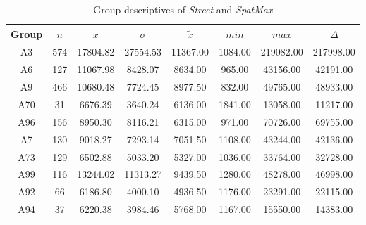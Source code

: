 \begin{table}[ht]
	\tiny
	\centering
	\begin{tabular}{c|c|c|c|c|c|c|c}
		\toprule
		Group & $n$ & $\bar{x}$ & $\sigma$ & $\tilde{x}$ & $min$ & $max$ & $\Delta$ \\  
		\midrule
		A3 & 574 & 17804.82 & 27554.53 & 11367.00 & 1084.00 & 219082.00 & 217998.00 \\ 
		A6 & 127 & 11067.98 & 8428.07 & 8634.00  & 965.00 & 43156.00 & 42191.00 \\ 
		A9 & 466 & 10680.48 & 7724.45 & 8977.50 & 832.00 & 49765.00 & 48933.00 \\ 
		A70 & 31 & 6676.39 & 3640.24 & 6136.00 & 1841.00 & 13058.00 & 11217.00 \\ 
		A96 & 156 & 8950.30 & 8116.21 & 6315.00 & 971.00 & 70726.00 & 69755.00 \\ 
		A7 & 130 & 9018.27 & 7293.14 & 7051.50 & 1108.00 & 43244.00 & 42136.00 \\ 
		A73 & 129 & 6502.88 & 5033.20 & 5327.00 & 1036.00 & 33764.00 & 32728.00 \\ 
		A99 & 116 & 13244.02 & 11313.27 & 9439.50 & 1280.00 & 48278.00 & 46998.00 \\ 
		A92 & 66 & 6186.80 & 4000.10 & 4936.50 & 1176.00 & 23291.00 & 22115.00 \\ 
		A94 & 37 & 6220.38 & 3984.46 & 5768.00 & 1167.00 & 15550.00 & 14383.00 \\ 
		\bottomrule
	\end{tabular}
	\caption{Group descriptives of \textit{Street} and \textit{SpatMax}}
	\label{tbl:descriptives_baysis_matched_Strasse_SMax}
\end{table}

